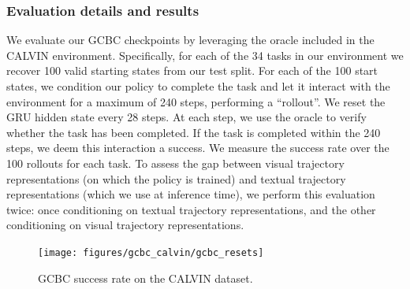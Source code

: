 \documentclass[../main.tex]{subfiles}
\begin{document}
\subsubsection{Evaluation details and results}\label{exp:sec:gmg-eval}

We evaluate our GCBC checkpoints by leveraging the oracle included in the CALVIN environment.
Specifically, for each of the 34 tasks in our environment we recover 100 valid starting states from
our test split. For each of the 100 start states, we condition our policy to complete the task and
let it interact with the environment for a maximum of 240 steps, performing a ``rollout''. We reset
the GRU hidden state every 28 steps. At each step, we use the oracle to verify whether the task has
been completed. If the task is completed within the 240 steps, we deem this interaction a success.
We measure the success rate over the 100 rollouts for each task. To assess the gap between visual
trajectory representations (on which the policy is trained) and textual trajectory representations
(which we use at inference time), we perform this evaluation twice: once conditioning on textual
trajectory representations, and the other conditioning on visual trajectory representations.

\begin{figure}[t]
	\centering
	\texttt{[image: figures/gcbc\_calvin/gcbc\_resets]}
	\caption[GCBC success rate on the CALVIN dataset]{GCBC success rate on the CALVIN dataset.}
	\label{fig:gcbc-calvin-res}
\end{figure}
\end{document}
